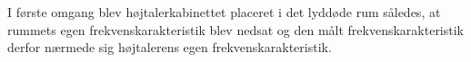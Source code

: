 I første omgang blev højtalerkabinettet placeret i det lyddøde rum således, at rummets egen frekvenskarakteristik blev nedsat  og den målt frekvenskarakteristik derfor nærmede sig højtalerens egen frekvenskarakteristik.



